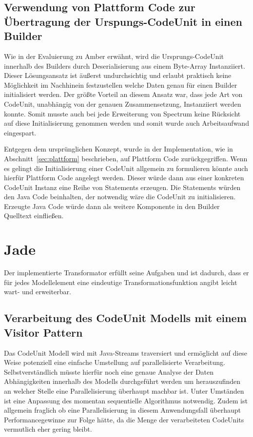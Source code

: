 \documentclass[12pt,oneside,a4paper,parskip]{scrbook}
\begin{document}
\subsection{Verwendung von Plattform Code zur Übertragung der Urspungs-CodeUnit in einen Builder}

Wie in der Evaluierung zu Amber erwähnt, wird die Ursprungs-CodeUnit innerhalb des Builders durch Deserialisierung aus einem Byte-Array Instanziiert. Dieser Lösungsansatz ist äußerst undurchsichtig und erlaubt praktisch keine Möglichkeit im Nachhinein festzustellen welche Daten genau für einen Builder initialisiert werden. Der größte Vorteil an diesem Ansatz war, dass jede Art von CodeUnit, unabhängig von der genauen Zusammensetzung, Instanziiert werden konnte. Somit musste auch bei jede Erweiterung von Spectrum keine Rücksicht auf diese Initialisierung genommen werden und somit wurde auch Arbeitsaufwand eingespart.

Entgegen dem ursprünglichen Konzept, wurde in der Implementation, wie in Abschnitt~\ref{sec:plattform} beschrieben, auf Plattform Code zurückgegriffen. Wenn es gelingt die Initialisierung einer CodeUnit allgemein zu formulieren könnte auch hierfür Plattform Code angelegt werden. Dieser würde dann aus einer konkreten CodeUnit Instanz eine Reihe von Statements erzeugen. Die Statements würden den Java Code beinhalten, der notwendig wäre die CodeUnit zu initialisieren. Erzeugte Java Code würde dann als weitere Komponente in den Builder Quelltext einfließen.

\section{Jade}

Der implementierte Transformator erfüllt seine Aufgaben und ist dadurch, dass er für jedes Modellelement eine eindeutige Transformationsfunktion angibt leicht wart- und erweiterbar. 

\subsection{Verarbeitung des CodeUnit Modells mit einem Visitor Pattern}

Das CodeUnit Modell wird mit Java-Streams traversiert und ermöglicht auf diese Weise potenziell eine einfache Umstellung auf parallelisierte Verarbeitung. Selbstverständlich müsste hierfür noch eine genaue Analyse der Daten Abhängigkeiten innerhalb des Modells durchgeführt werden um herauszufinden an welcher Stelle eine Parallelisierung überhaupt machbar ist. Unter Umständen ist eine Anpassung des momentan sequentielle Algorithmus notwendig. Zudem ist allgemein fraglich ob eine Parallelisierung in diesem Anwendungsfall überhaupt Performancegewinne zur Folge hätte, da die Menge der verarbeiteten CodeUnits vermutlich eher gering bleibt.
\end{document}
